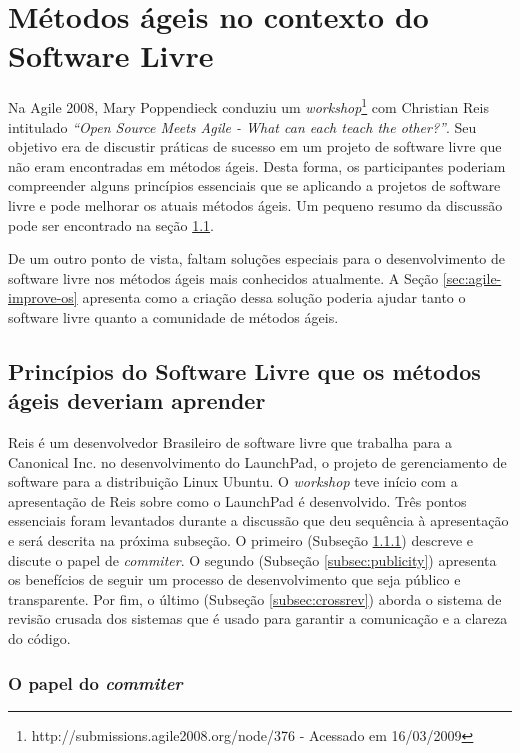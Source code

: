 \chapter{Métodos ágeis no contexto do Software Livre}
\label{cap:agile}

Na Agile 2008, Mary Poppendieck conduziu um
\emph{workshop}\footnote{http://submissions.agile2008.org/node/376 -
  Acessado em 16/03/2009} com Christian Reis intitulado \emph{``Open
  Source Meets Agile - What can each teach the other?''}. Seu objetivo
era de discustir práticas de sucesso em um projeto de software livre
que não eram encontradas em métodos ágeis. Desta forma, os
participantes poderiam compreender alguns princípios essenciais que se
aplicando a projetos de software livre e pode melhorar os atuais
métodos ágeis. Um pequeno resumo da discussão pode ser encontrado na
seção \ref{sec:foss-over-agile}.

De um outro ponto de vista, faltam soluções especiais para o
desenvolvimento de software livre nos métodos ágeis mais conhecidos
atualmente. A Seção \ref{sec:agile-improve-os} apresenta como a
criação dessa solução poderia ajudar tanto o software livre quanto a
comunidade de métodos ágeis.

\section{Princípios do Software Livre que os métodos ágeis deveriam
  aprender}
\label{sec:foss-over-agile}

Reis é um desenvolvedor Brasileiro de software livre que trabalha para
a Canonical Inc. no desenvolvimento do LaunchPad, o projeto de
gerenciamento de software para a distribuição Linux Ubuntu. O
\emph{workshop} teve início com a apresentação de Reis sobre como o
LaunchPad é desenvolvido. Três pontos essenciais foram levantados
durante a discussão que deu sequência à apresentação e será descrita
na próxima subseção. O primeiro (Subseção \ref{subsec:commiter})
descreve e discute o papel de \emph{commiter}.%
O segundo (Subseção \ref{subsec:publicity}) apresenta os benefícios de
seguir um processo de desenvolvimento que seja público e transparente.
Por fim, o último (Subseção \ref{subsec:crossrev}) aborda o sistema de
revisão crusada dos sistemas que é usado para garantir a comunicação e
a clareza do código.

\subsection{O papel do \emph{commiter}}
\label{subsec:commiter}


